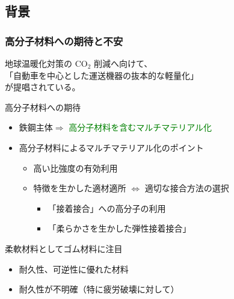 \documentclass[12pt, dvipdfmx]{beamer}
\begin{document}
\subsection{背景}

\begin{frame}
	\frametitle{高分子材料への期待と不安}
	地球温暖化対策の CO$_2$ 削減へ向けて、\\
	「自動車を中心とした運送機器の{\color{red}抜本的な軽量化}」\\
	が提唱されている。
	\begin{block}{高分子材料への期待}
		\begin{itemize}
			\item 鉄鋼主体$ \Rightarrow$ \textcolor{green}{高分子材料を含むマルチマテリアル化}
			\item 高分子材料によるマルチマテリアル化のポイント
				\begin{itemize}
					\item \alert{高い比強度}の有効利用
					\item 特徴を生かした適材適所 $\Leftrightarrow$ 適切な接合方法の選択
						\begin{itemize}
							\item {\color{red} 「接着接合」への高分子の利用}
							\item {\color{red} 「柔らかさを生かした弾性接着接合」}
						\end{itemize}
				\end{itemize}
		\end{itemize}
	\end{block}
	\begin{alertblock}{柔軟材料としてゴム材料に注目}
		\begin{itemize}
			\item 耐久性、可逆性に優れた材料
			\item {\color{blue}耐久性が不明確（特に疲労破壊に対して）}
		\end{itemize}
	\end{alertblock}
\end{frame}
\end{document}
